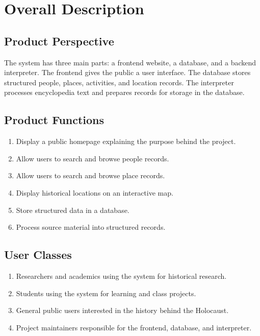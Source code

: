 \section{Overall Description}

\subsection{Product Perspective}
The system has three main parts: a frontend website, a database, and a backend interpreter. The frontend gives the public a user interface. The database stores structured people, places, activities, and location records. The interpreter processes encyclopedia text and prepares records for storage in the database.

\subsection{Product Functions}

\begin{enumerate}
	\item Display a public homepage explaining the purpose behind the project.
	\item Allow users to search and browse people records.
	\item Allow users to search and browse place records.
	\item Display historical locations on an interactive map.
	\item Store structured data in a database.
	\item Process source material into structured records.
\end{enumerate}

\subsection{User Classes}

\begin{enumerate}
	\item Researchers and academics using the system for historical research.
	\item Students using the system for learning and class projects.
	\item General public users interested in the history behind the Holocaust.
	\item Project maintainers responsible for the frontend, database, and interpreter.
\end{enumerate}
